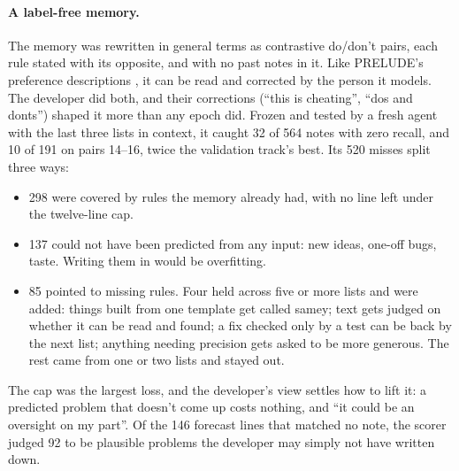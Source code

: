 \documentclass[10pt]{article}
\begin{document}
\paragraph{A label-free memory.} The memory was rewritten in general terms as contrastive do/don't pairs, each rule stated with its opposite, and with no past notes in it. Like PRELUDE's preference descriptions \citep{gao2024aligning}, it can be read and corrected by the person it models. The developer did both, and their corrections (``this is cheating'', ``dos and donts'') shaped it more than any epoch did. Frozen and tested by a fresh agent with the last three lists in context, it caught 32 of 564 notes with zero recall, and 10 of 191 on pairs 14--16, twice the validation track's best. Its 520 misses split three ways:
\begin{itemize}[leftmargin=*]
  \item 298 were covered by rules the memory already had, with no line left under the twelve-line cap.
  \item 137 could not have been predicted from any input: new ideas, one-off bugs, taste. Writing them in would be overfitting.
  \item 85 pointed to missing rules. Four held across five or more lists and were added: things built from one template get called samey; text gets judged on whether it can be read and found; a fix checked only by a test can be back by the next list; anything needing precision gets asked to be more generous. The rest came from one or two lists and stayed out.
\end{itemize}
The cap was the largest loss, and the developer's view settles how to lift it: a predicted problem that doesn't come up costs nothing, and ``it could be an oversight on my part''. Of the 146 forecast lines that matched no note, the scorer judged 92 to be plausible problems the developer may simply not have written down.
\end{document}
